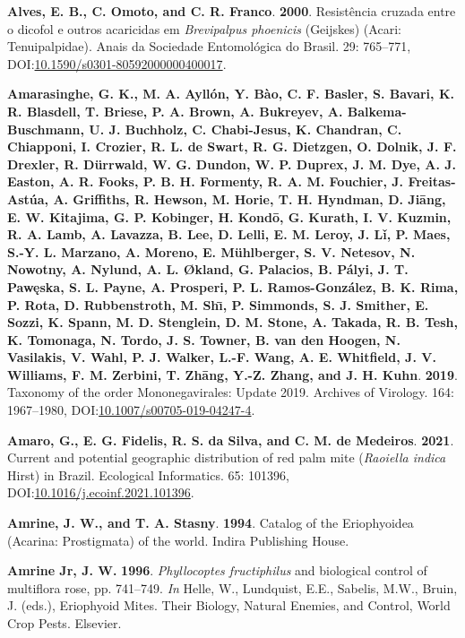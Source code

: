 \documentclass[12pt,final,CPage]{ufthesis}
\newlength{\cslhangindent}
\newenvironment{CSLReferences}[2] %
{%
	\setlength{\parindent}{0pt}
	\ifodd #1 \everypar{\setlength{\hangindent}{\cslhangindent}}\ignorespaces\fi
	\ifnum #2 > 0
	\setlength{\parskip}{#2\baselineskip}
	\fi
}%
{}
\begin{document}
{\begin{CSLReferences}{1}{0}
  \leavevmode{}%
  \textbf{Alves, E. B., C. Omoto, and C. R. Franco}. \textbf{2000}. Resist{ê}ncia cruzada entre o dicofol e outros acaricidas em {\emph{Brevipalpus phoenicis}} ({Geijskes}) ({Acari}: {Tenuipalpidae}). Anais da Sociedade Entomol{ó}gica do Brasil. 29: 765--771, DOI:\href{https://doi.org/10.1590/s0301-80592000000400017}{10.1590/s0301-80592000000400017}.

  \leavevmode{}%
  \textbf{Amarasinghe, G. K., M. A. Ayllón, Y. Bào, C. F. Basler, S. Bavari, K. R. Blasdell, T. Briese, P. A. Brown, A. Bukreyev, A. Balkema-Buschmann, U. J. Buchholz, C. Chabi-Jesus, K. Chandran, C. Chiapponi, I. Crozier, R. L. de Swart, R. G. Dietzgen, O. Dolnik, J. F. Drexler, R. Dürrwald, W. G. Dundon, W. P. Duprex, J. M. Dye, A. J. Easton, A. R. Fooks, P. B. H. Formenty, R. A. M. Fouchier, J. Freitas-Astúa, A. Griffiths, R. Hewson, M. Horie, T. H. Hyndman, D. Jiāng, E. W. Kitajima, G. P. Kobinger, H. Kondō, G. Kurath, I. V. Kuzmin, R. A. Lamb, A. Lavazza, B. Lee, D. Lelli, E. M. Leroy, J. Lǐ, P. Maes, S.-Y. L. Marzano, A. Moreno, E. Mühlberger, S. V. Netesov, N. Nowotny, A. Nylund, A. L. Økland, G. Palacios, B. Pályi, J. T. Pawęska, S. L. Payne, A. Prosperi, P. L. Ramos-González, B. K. Rima, P. Rota, D. Rubbenstroth, M. Shı̄, P. Simmonds, S. J. Smither, E. Sozzi, K. Spann, M. D. Stenglein, D. M. Stone, A. Takada, R. B. Tesh, K. Tomonaga, N. Tordo, J. S. Towner, B. van den Hoogen, N. Vasilakis, V. Wahl, P. J. Walker, L.-F. Wang, A. E. Whitfield, J. V. Williams, F. M. Zerbini, T. Zhāng, Y.-Z. Zhang, and J. H. Kuhn}. \textbf{2019}. Taxonomy of the order {Mononegavirales}: Update 2019. Archives of Virology. 164: 1967--1980, DOI:\href{https://doi.org/10.1007/s00705-019-04247-4}{10.1007/s00705-019-04247-4}.

  \leavevmode{}%
  \textbf{Amaro, G., E. G. Fidelis, R. S. da Silva, and C. M. de Medeiros}. \textbf{2021}. Current and potential geographic distribution of red palm mite ({\emph{Raoiella indica}} {Hirst}) in {Brazil}. Ecological Informatics. 65: 101396, DOI:\href{https://doi.org/10.1016/j.ecoinf.2021.101396}{10.1016/j.ecoinf.2021.101396}.

  \leavevmode{}%
  \textbf{Amrine, J. W., and T. A. Stasny}. \textbf{1994}. Catalog of the {Eriophyoidea} ({Acarina}: {Prostigmata}) of the world. Indira Publishing House.

  \leavevmode{}%
  \textbf{Amrine Jr, J. W.} \textbf{1996}. {\emph{Phyllocoptes fructiphilus}} and biological control of multiflora rose, pp. 741--749. \emph{In} Helle, W., Lundquist, E.E., Sabelis, M.W., Bruin, J. (eds.), Eriophyoid Mites. Their Biology, Natural Enemies, and Control, World Crop Pests. Elsevier.


\end{CSLReferences}}
\end{document}
